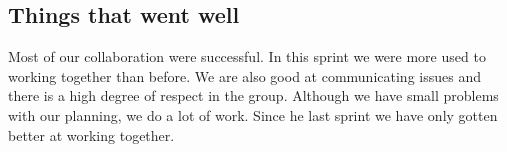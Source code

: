 \subsection{Things that went well}
Most of our collaboration were successful. In this sprint we were more used to working together than before. We are also good at communicating issues and there is a high degree of respect in the group. Although we have small problems with our planning, we do a lot of work. Since he last sprint we have only gotten better at working together.
